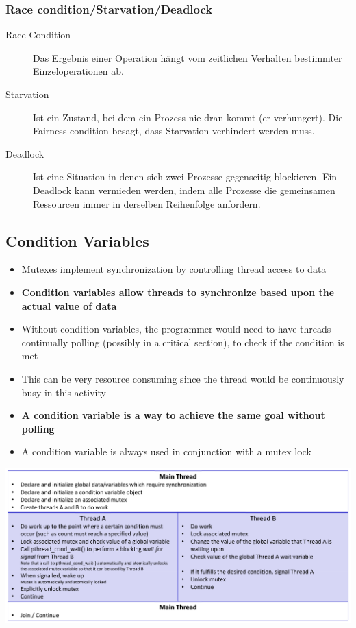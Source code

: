 \subsubsection{Race condition/Starvation/Deadlock}
\begin{description}
 \item[Race Condition]  Das Ergebnis einer Operation hängt vom zeitlichen Verhalten bestimmter Einzeloperationen ab.
 \item[Starvation]      Ist ein Zustand, bei dem ein Prozess nie dran kommt (er verhungert). Die Fairness condition besagt, dass Starvation verhindert werden muss.
 \item[Deadlock]        Ist eine Situation in denen sich zwei Prozesse gegenseitig blockieren. Ein Deadlock kann vermieden werden, indem alle Prozesse die gemeinsamen Ressourcen immer in derselben Reihenfolge anfordern.
\end{description}

\subsection{Condition Variables}
\begin{itemize}
  \item Mutexes implement synchronization by controlling thread access to data
  \item \textbf{Condition variables allow threads to synchronize based upon the actual value of data}
  \item Without condition variables, the programmer would need to have threads continually polling (possibly in a critical section), to check if the condition is met
  \item This can be very resource consuming since the thread would be continuously busy in this activity
  \item \textbf{A condition variable is a way to achieve the same goal without polling}
  \item A condition variable is always used in conjunction with a mutex lock
\end{itemize}
\begin{center}
\begin{minipage}{0.8\linewidth}
  \includegraphics[width=\linewidth]{images/Concurrency/conditionVariablesAblauf}
\end{minipage}
\end{center}


